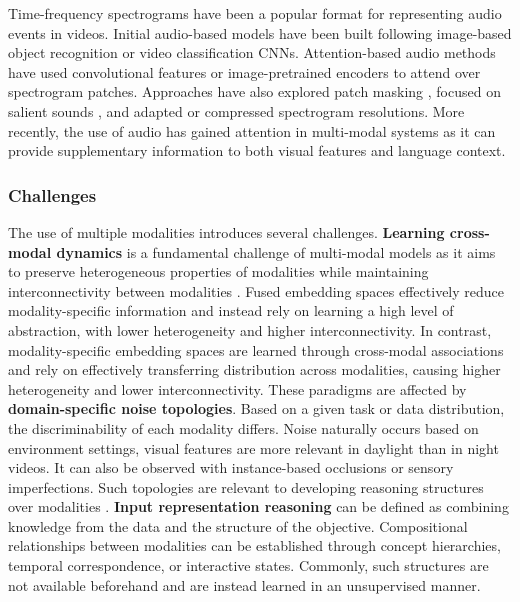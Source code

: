 Time-frequency spectrograms have been a popular format for representing audio events in videos. Initial audio-based models have been built following image-based object recognition \citep{gong2021psla} or video classification \citep{kazakos2021slow} CNNs. Attention-based audio methods have used convolutional features \citep{gulati2020conformer,kong2020panns} or image-pretrained encoders \citep{koutini2021efficient} to attend over spectrogram patches. Approaches have also explored patch masking \citep{baade2022mae,huang2022masked}, focused on salient sounds \citep{stergiou2023play}, and adapted \citep{liu2022learning_the} or compressed \citep{feng2024coarse} spectrogram resolutions. More recently, the use of audio has gained attention in multi-modal systems as it can provide supplementary information to both visual features and language context. 


\subsubsection{Challenges}

The use of multiple modalities introduces several challenges. \textbf{Learning cross-modal dynamics} is a fundamental challenge of multi-modal models as it aims to preserve heterogeneous properties of modalities while maintaining interconnectivity between modalities \citep{liang2022foundations}. Fused embedding spaces \citep{girdhar2023imagebind,girdhar2022omnivore,piergiovanni2023rethinking,zhu2024languagebind} effectively reduce modality-specific information and instead rely on learning a high level of abstraction, with lower heterogeneity and higher interconnectivity. In contrast, modality-specific embedding spaces \citep{gong2022uavm,gong2023contrastive,chen2024soundingactions,recasens2021broaden} are learned through cross-modal associations and rely on effectively transferring distribution across modalities, causing higher heterogeneity and lower interconnectivity. These paradigms are affected by \textbf{domain-specific noise topologies}. Based on a given task or data distribution, the discriminability of each modality differs. Noise naturally occurs based on environment settings, \eg visual features are more relevant in daylight than in night videos. It can also be observed with instance-based occlusions or sensory imperfections. Such topologies are relevant to developing reasoning structures over modalities \citep{gat2021perceptual}. \textbf{Input representation reasoning} can be defined as combining knowledge from the data and the structure of the objective. Compositional relationships between modalities can be established through concept hierarchies, temporal correspondence, or interactive states. Commonly, such structures are not available beforehand and are instead learned in an unsupervised manner.




